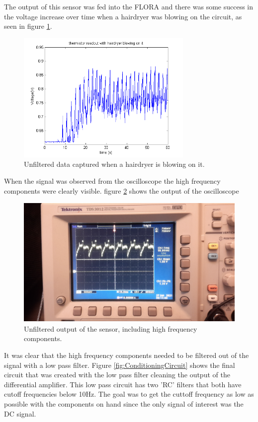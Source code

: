 \documentclass[12pt,a4paper]{report}
\begin{document}
 The output of this sensor was fed into the FLORA and there was some success in the voltage increase over time when a hairdryer was blowing on the circuit, as seen in figure \ref{fig:UnfilteredFLORA}. 

\begin{figure}[h!]
    \centering
    \includegraphics[height = 2.5in]{Images/UnfilteredOutput.png}
    \caption{Unfiltered data captured when a hairdryer is blowing on it.}
    \label{fig:UnfilteredFLORA}
\end{figure}

When the signal was observed from the oscilloscope the high frequency components were clearly visible. figure \ref{fig:UnfilteredOutput} shows the output of the oscilloscope

\begin{figure}[h!]
    \centering
    \includegraphics[height = 2.5in]{Images/TempSensOutUnfiltered.jpg}
    \caption{Unfiltered output of the sensor, including high frequency components.}
    \label{fig:UnfilteredOutput}
\end{figure}


It was clear that the high frequency components needed to be filtered out of the signal with a low pass filter. Figure \ref{fig:ConditioningCircuit} shows the final circuit that was created with the low pass filter cleaning the output of the differential amplifier. This low pass circuit has two 'RC' filters that both have cutoff frequencies below 10Hz. The goal was to get the cuttoff frequency as low as possible with the components on hand since the only signal of interest was the DC signal. 
\end{document}
